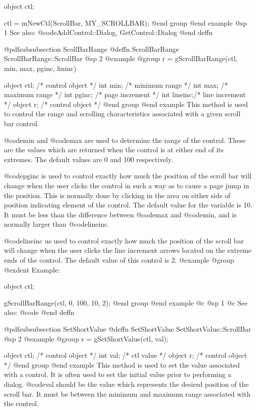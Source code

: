 object  ctl;

ctl = mNewCtl(ScrollBar, MY_SCROLLBAR);
@end group
@end example
@sp 1
See also:  @code{AddControl::Dialog, GetControl::Dialog}
@end deffn






@pdfsubsubsection {ScollBarRange}
@deffn {ScrollBarRange} ScrollBarRange::ScrollBar
@sp 2
@example
@group
r = gScrollBarRange(ctl, min, max, pginc, lininc)

object  ctl;    /*  control object  */
int     min;    /*  minimum range   */
int     max;    /*  maximum range   */
int     pginc;  /*  page increment  */
int     lineinc;/*  line increment  */
object  r;      /*  control object  */
@end group
@end example
This method is used to control the range and scrolling characteristics
associated with a given scroll bar control.

@code{min} and @code{max} are used to determine the range of the
control.  These are the values which are returned when the control
is at either end of its extremes.  The default values are 0 and
100 respectively.

@code{pginc} is used to control exactly how much the position of the
scroll bar will change when the user clicks the control in such a way
as to cause a page jump in the position.  This is normally done by
clicking in the area on either side of position indicating element of the
control.  The default value for the variable is 10.  It must be less than
the difference between @code{max} and @code{min}, and is normally larger
than @code{lineinc}.

@code{lineinc} us used to control exactly how much the position of the
scroll bar will change when the user clicks the line increment arrows
located on the extreme ends of the control.  The default value of this
control is 2.
@example
@group
@exdent Example:

object  ctl;

gScrollBarRange(ctl, 0, 100, 10, 2);
@end group
@end example
@c @sp 1
@c See also:  @code{}
@end deffn














@pdfsubsubsection {SetShortValue}
@deffn {SetShortValue} SetShortValue::ScrollBar
@sp 2
@example
@group
r = gSetShortValue(ctl, val);

object  ctl;    /*  control object  */
int     val;    /*  ctl value       */
object  r;      /*  control object  */
@end group
@end example
This method is used to set the value associated with a control.  It is
often used to set the initial value prior to performing a dialog.
@code{val} should be the value which represents the desired
position of the scroll bar.  It must be between the minimum and
maximum range associated with the control.


